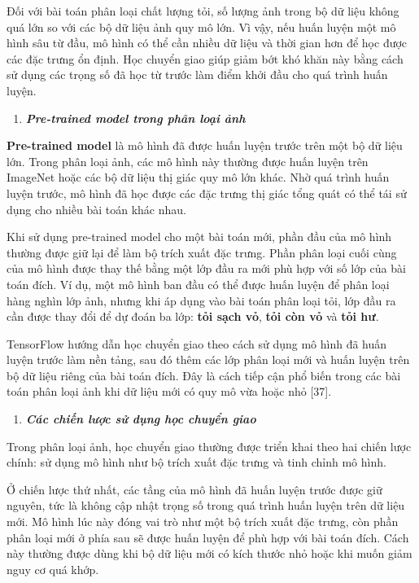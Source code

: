 \documentclass[
]{article}
\begin{document}
Đối với bài toán phân loại chất lượng tỏi, số lượng ảnh trong bộ dữ liệu
không quá lớn so với các bộ dữ liệu ảnh quy mô lớn. Vì vậy, nếu huấn
luyện một mô hình sâu từ đầu, mô hình có thể cần nhiều dữ liệu và thời
gian hơn để học được các đặc trưng ổn định. Học chuyển giao giúp giảm
bớt khó khăn này bằng cách sử dụng các trọng số đã học từ trước làm điểm
khởi đầu cho quá trình huấn luyện.

\begin{enumerate}
\def\labelenumi{\arabic{enumi}.}
\setcounter{enumi}{1}
\item
  \protect{}\label{_Toc232112013}{}\emph{\textbf{Pre-trained
  model trong phân loại ảnh}}
\end{enumerate}

\textbf{Pre-trained model} là mô hình đã được huấn luyện trước trên một
bộ dữ liệu lớn. Trong phân loại ảnh, các mô hình này thường được huấn
luyện trên ImageNet hoặc các bộ dữ liệu thị giác quy mô lớn khác. Nhờ
quá trình huấn luyện trước, mô hình đã học được các đặc trưng thị giác
tổng quát có thể tái sử dụng cho nhiều bài toán khác nhau.

Khi sử dụng pre-trained model cho một bài toán mới, phần đầu của mô hình
thường được giữ lại để làm bộ trích xuất đặc trưng. Phần phân loại cuối
cùng của mô hình được thay thế bằng một lớp đầu ra mới phù hợp với số
lớp của bài toán đích. Ví dụ, một mô hình ban đầu có thể được huấn luyện
để phân loại hàng nghìn lớp ảnh, nhưng khi áp dụng vào bài toán phân
loại tỏi, lớp đầu ra cần được thay đổi để dự đoán ba lớp: \textbf{tỏi
sạch vỏ}, \textbf{tỏi còn vỏ} và \textbf{tỏi hư}.

TensorFlow hướng dẫn học chuyển giao theo cách sử dụng mô hình đã huấn
luyện trước làm nền tảng, sau đó thêm các lớp phân loại mới và huấn
luyện trên bộ dữ liệu riêng của bài toán đích. Đây là cách tiếp cận phổ
biến trong các bài toán phân loại ảnh khi dữ liệu mới có quy mô vừa hoặc
nhỏ {[}37{]}.

\begin{enumerate}
\def\labelenumi{\arabic{enumi}.}
\setcounter{enumi}{2}
\item
  \protect{}\label{_Toc232112014}{}\emph{\textbf{Các chiến
  lược sử dụng học chuyển giao}}
\end{enumerate}

Trong phân loại ảnh, học chuyển giao thường được triển khai theo hai
chiến lược chính: sử dụng mô hình như bộ trích xuất đặc trưng và tinh
chỉnh mô hình.

Ở chiến lược thứ nhất, các tầng của mô hình đã huấn luyện trước được giữ
nguyên, tức là không cập nhật trọng số trong quá trình huấn luyện trên
dữ liệu mới. Mô hình lúc này đóng vai trò như một bộ trích xuất đặc
trưng, còn phần phân loại mới ở phía sau sẽ được huấn luyện để phù hợp
với bài toán đích. Cách này thường được dùng khi bộ dữ liệu mới có kích
thước nhỏ hoặc khi muốn giảm nguy cơ quá khớp.
\end{document}
